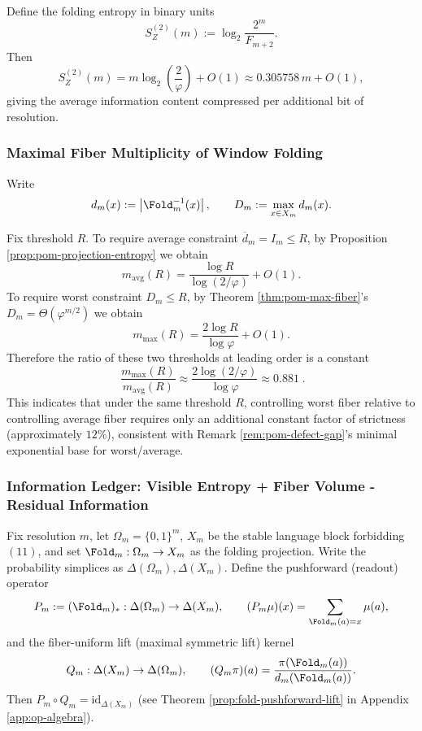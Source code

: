 \begin{remark}\label{rem:pom-fold-bits}
Define the folding entropy in binary units
\[
S_Z^{(2)}(m):=\log_2\frac{2^m}{F_{m+2}}.
\]
Then
\[
S_Z^{(2)}(m)=m\log_2\!\left(\frac{2}{\varphi}\right)+O(1)
\approx 0.305758\,m+O(1),
\]
giving the average information content compressed per additional bit of resolution.
\end{remark}

\subsubsection{Maximal Fiber Multiplicity of Window Folding}\label{subsec:pom-max-fiber}
Write
\[
d_m(x):=\left|\Fold_m^{-1}(x)\right|,
\qquad
D_m:=\max_{x\in X_m} d_m(x).
\]

\begin{remark}\label{rem:pom-avg-vs-max-threshold}
Fix threshold $R$. To require average constraint $\overline d_m=I_m\le R$, by Proposition \ref{prop:pom-projection-entropy} we obtain
\[
m_{\mathrm{avg}}(R)=\frac{\log R}{\log(2/\varphi)}+O(1).
\]
To require worst constraint $D_m\le R$, by Theorem \ref{thm:pom-max-fiber}'s $D_m=\Theta(\varphi^{m/2})$ we obtain
\[
m_{\max}(R)=\frac{2\log R}{\log\varphi}+O(1).
\]
Therefore the ratio of these two thresholds at leading order is a constant
\[
\boxed{\;
\frac{m_{\max}(R)}{m_{\mathrm{avg}}(R)}
\approx
\frac{2\log(2/\varphi)}{\log\varphi}
\approx 0.881\; }.
\]
This indicates that under the same threshold $R$, controlling worst fiber relative to controlling average fiber requires only an additional constant factor of strictness (approximately $12\%$), consistent with Remark \ref{rem:pom-defect-gap}'s minimal exponential base for worst/average.
\end{remark}
\subsubsection{Information Ledger: Visible Entropy + Fiber Volume - Residual Information}\label{subsec:pom-information-ledger}
Fix resolution $m$, let $\Omega_m=\{0,1\}^m$, $X_m$ be the stable language block forbidding $(11)$, and set $\Fold_m:\Omega_m\to X_m$ as the folding projection.
Write the probability simplices as $\Delta(\Omega_m),\Delta(X_m)$.
Define the pushforward (readout) operator
\[
P_m:=(\Fold_m)_*:\Delta(\Omega_m)\to\Delta(X_m),
\qquad
(P_m\mu)(x)=\sum_{\Fold_m(a)=x}\mu(a),
\]
and the fiber-uniform lift (maximal symmetric lift) kernel
\[
Q_m:\Delta(X_m)\to\Delta(\Omega_m),
\qquad
(Q_m\pi)(a)=\frac{\pi(\Fold_m(a))}{d_m(\Fold_m(a))}.
\]
Then $P_m\circ Q_m=\mathrm{id}_{\Delta(X_m)}$ (see Theorem \ref{prop:fold-pushforward-lift} in Appendix \ref{app:op-algebra}).

